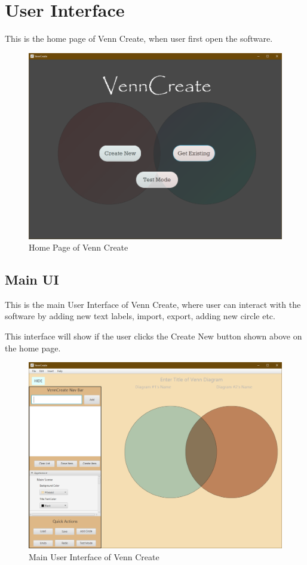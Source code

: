 \documentclass[fontsize=12pt,paper=letter,twoside]{scrartcl}
\begin{document}
\newpage
\section{User Interface}

This is the home page of Venn Create, when user first open the software.

\begin{figure}[hbt]
	\includegraphics[width=\textwidth]{images/user-interface.png}
	\caption{Home Page of Venn Create}
\end{figure}

\newpage

\subsection{Main UI}

This is the main User Interface of Venn Create, where user can interact with the software by adding new text labels, import, export, adding new circle etc.

This interface will show if the user clicks the Create New button shown above on the home page.

\begin{figure}[!hbt]
	\includegraphics[width=\textwidth]{images/user-interface-normal.png}
	\caption{Main User Interface of Venn Create}
\end{figure}
\end{document}
